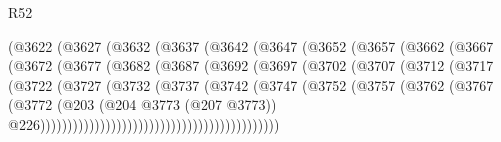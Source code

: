 \begin{lexlean}{R52}
\begin{coremodule}
                            (@3622
                              (@3627
                                (@3632
                                  (@3637
                                    (@3642
                                      (@3647
                                        (@3652
                                          (@3657
                                            (@3662
                                              (@3667
                                                (@3672
                                                  (@3677
                                                    (@3682
                                                      (@3687
                                                        (@3692
                                                          (@3697
                                                            (@3702
                                                              (@3707
                                                                (@3712
                                                                  (@3717
                                                                    (@3722
                                                                      (@3727
                                                                        (@3732
                                                                          (@3737
                                                                            (@3742
                                                                              (@3747
                                                                                (@3752
                                                                                  (@3757
                                                                                    (@3762
                                                                                      (@3767
                                                                                        (@3772
                                                                                          (@203
                                                                                            (@204
                                                                                              @3773
                                                                                              (@207
                                                                                                @3773))
                                                                                            @226))))))))))))))))))))))))))))))))))))))))))))

\end{coremodule}
\end{lexlean}
